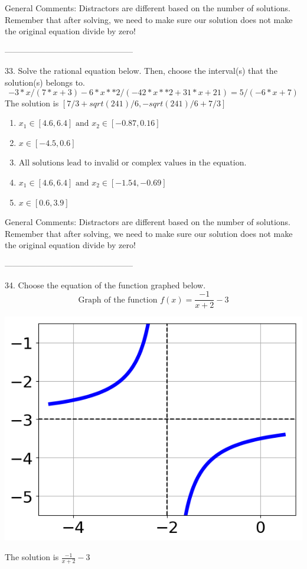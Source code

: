 \documentclass{article}[10pt]
\begin{document}
General Comments: Distractors are different based on the number of solutions. Remember that after solving, we need to make sure our solution does not make the original equation divide by zero!

-----------------------------------------------

33. Solve the rational equation below. Then, choose the interval(s) that the solution(s) belongs to.
$$ -3*x/(7*x + 3) - 6*x**2/(-42*x**2 + 31*x + 21) = 5/(-6*x + 7) $$ 
The solution is $ [7/3 + sqrt(241)/6, -sqrt(241)/6 + 7/3] $ 

\begin{enumerate}[label=\Alph*.] 
\item $ x_1 \in [4.6, 6.4] \text{ and } x_2 \in [-0.87,0.16] $ 

  
\item $ x \in [-4.5,0.6] $ 

  
\item $ \text{All solutions lead to invalid or complex values in the equation.} $ 

  
\item $ x_1 \in [4.6, 6.4] \text{ and } x_2 \in [-1.54,-0.69] $ 

  
\item $ x \in [0.6,3.9] $ 

  
\end{enumerate} 
 
General Comments: Distractors are different based on the number of solutions. Remember that after solving, we need to make sure our solution does not make the original equation divide by zero!

-----------------------------------------------

34. Choose the equation of the function graphed below.
$$ \text{Graph of the function } f(x) = \frac{-1}{x + 2} - 3 $$ 
\begin{center}\includegraphics[scale=0.5]{../Figures/question34B.png}\end{center}The solution is $ \frac{-1}{x + 2} - 3 $ 
\end{document}
